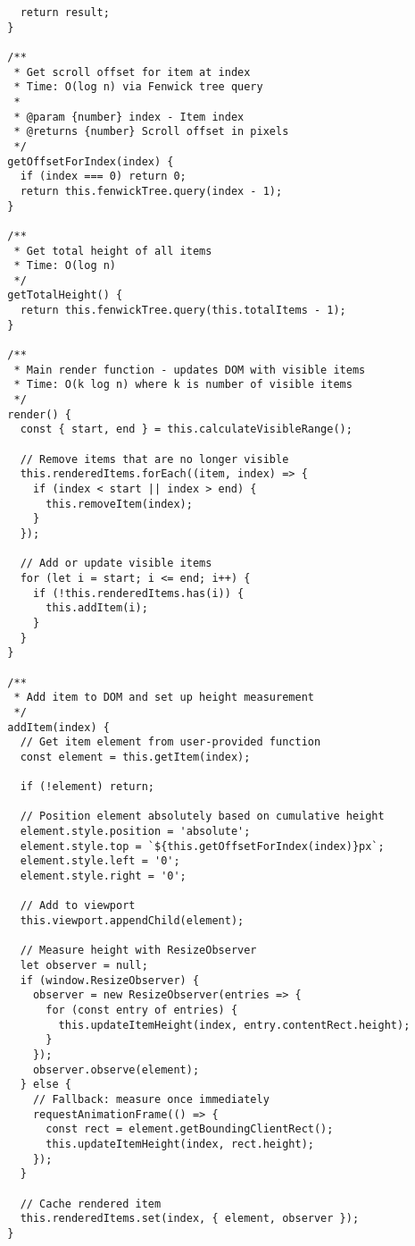 \documentclass[11pt]{article}
\begin{document}
\begin{verbatim}
    return result;
  }
  
  /**
   * Get scroll offset for item at index
   * Time: O(log n) via Fenwick tree query
   * 
   * @param {number} index - Item index
   * @returns {number} Scroll offset in pixels
   */
  getOffsetForIndex(index) {
    if (index === 0) return 0;
    return this.fenwickTree.query(index - 1);
  }
  
  /**
   * Get total height of all items
   * Time: O(log n)
   */
  getTotalHeight() {
    return this.fenwickTree.query(this.totalItems - 1);
  }
  
  /**
   * Main render function - updates DOM with visible items
   * Time: O(k log n) where k is number of visible items
   */
  render() {
    const { start, end } = this.calculateVisibleRange();
    
    // Remove items that are no longer visible
    this.renderedItems.forEach((item, index) => {
      if (index < start || index > end) {
        this.removeItem(index);
      }
    });
    
    // Add or update visible items
    for (let i = start; i <= end; i++) {
      if (!this.renderedItems.has(i)) {
        this.addItem(i);
      }
    }
  }
  
  /**
   * Add item to DOM and set up height measurement
   */
  addItem(index) {
    // Get item element from user-provided function
    const element = this.getItem(index);
    
    if (!element) return;
    
    // Position element absolutely based on cumulative height
    element.style.position = 'absolute';
    element.style.top = `${this.getOffsetForIndex(index)}px`;
    element.style.left = '0';
    element.style.right = '0';
    
    // Add to viewport
    this.viewport.appendChild(element);
    
    // Measure height with ResizeObserver
    let observer = null;
    if (window.ResizeObserver) {
      observer = new ResizeObserver(entries => {
        for (const entry of entries) {
          this.updateItemHeight(index, entry.contentRect.height);
        }
      });
      observer.observe(element);
    } else {
      // Fallback: measure once immediately
      requestAnimationFrame(() => {
        const rect = element.getBoundingClientRect();
        this.updateItemHeight(index, rect.height);
      });
    }
    
    // Cache rendered item
    this.renderedItems.set(index, { element, observer });
  }
  

\end{verbatim}
\end{document}
